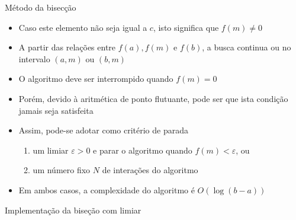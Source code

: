 \begin{frame}[fragile]{Método da bisecção}

    \begin{itemize}
        \item Caso este elemento não seja igual a $c$, isto significa que $f(m) \neq 0$

        \item A partir das relações entre $f(a), f(m)$ e $f(b)$, a busca continua ou no intervalo
            $(a, m)$ ou $(b, m)$

        \item O algoritmo deve ser interrompido quando $f(m) = 0$

        \item Porém, devido à aritmética de ponto flutuante, pode ser que ista condição jamais seja
            satisfeita

        \item Assim, pode-se adotar como critério de parada
        \begin{enumerate}
            \item um limiar $\varepsilon > 0$ e parar o algoritmo quando $f(m) < \varepsilon$, ou
            \item um número fixo $N$ de interações do algoritmo
        \end{enumerate}

        \item Em ambos casos, a complexidade do algoritmo é $O(\log(b - a))$
    \end{itemize}

\end{frame}

\begin{frame}[fragile]{Implementação da biseção com limiar}
\end{frame}

